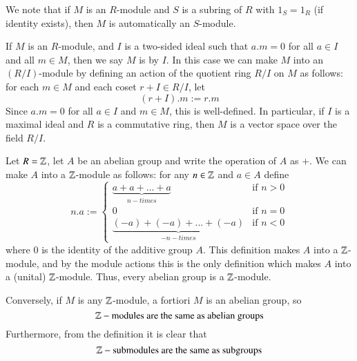 We note that if $M$ is an $R$-module and $S$ is a subring of $R$ with $1_S = 1_R$ (if identity exists), then $M$ is automatically an $S$-module. 

\begin{defn}
    If $M$ is an $R$-module, and $I$ is a two-sided ideal such that $a.m = 0$ for all $a \in I$ and all $m \in M$, then we say $M$ is  by $I$. In this case we can make $M$ into an $(R/I)$-module by defining an action of the quotient ring $R/I$ on $M$ as follows: for each $m\in M$ and each coset $r+I \in R/I$, let \begin{equation*}
        (r+I).m := r.m
    \end{equation*}
    Since $a.m = 0$ for all $a \in I$ and $m \in M$, this is well-defined. In particular, if $I$ is a maximal ideal and $R$ is a commutative ring, then $M$ is a vector space over the field $R/I$.
\end{defn}


\begin{eg}[(Z-Modules)]
    Let $R=\mathbb Z$, let $A$ be an abelian group and write the operation of $A$ as $+$. We can make $A$ into a $\mathbb Z$-module as follows: for any $n \in \mathbb Z$ and $a \in A$ define \begin{equation*}
        n.a := \left\{\begin{array}{lc} \underbrace{a+a+...+a}_{n-times} & \text{if } n > 0 \\ 0 & \text{if } n = 0 \\ \underbrace{(-a)+(-a)+...+(-a)}_{-n-times} & \text{if } n < 0
        \end{array}\right.
    \end{equation*}
    where $0$ is the identity of the additive group $A$. This definition makes $A$ into a $\mathbb Z$-module, and by the module actions this is the only definition which makes $A$ into a (unital) $\mathbb Z$-module. Thus, every abelian group is a $\mathbb Z$-module. 


    Conversely, if $M$ is any $\mathbb Z$-module, a fortiori $M$ is an abelian group, so \begin{equation*}
        \mathbb Z-\text{modules are the same as abelian groups}
    \end{equation*}
    Furthermore, from the definition it is clear that \begin{equation*}
        \mathbb Z-\text{submodules are the same as subgroups}
    \end{equation*}
\end{eg}



